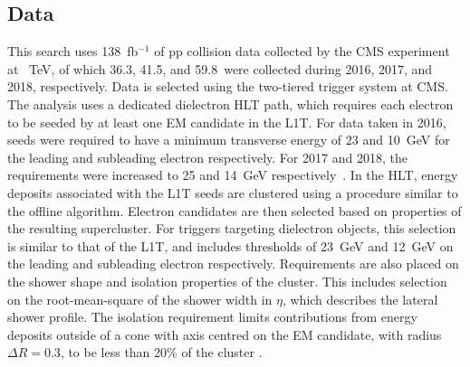 \subsection{Data}

This search uses 138~fb$^{-1}$ of pp collision data collected by the CMS experiment at \sqrts~TeV, of which 36.3, 41.5, and 59.8~\fbinv were collected during 2016, 2017, and 2018, respectively.
Data is selected using the two-tiered trigger system at CMS. 
The analysis uses a dedicated dielectron HLT path, which requires each electron to be seeded by at least one EM candidate in the L1T. For data taken in 2016, seeds were required to have a minimum transverse energy of 23 and 10~GeV for the leading and subleading electron respectively. For 2017 and 2018, the requirements were increased to 25 and 14~GeV respectively~\cite{CMS_egamma_performance}.
In the HLT, energy deposits associated with the L1T seeds are clustered using a procedure similar to the offline algorithm. Electron candidates are then selected based on properties of the resulting supercluster. For triggers targeting dielectron objects, this selection is similar to that of the L1T, and includes thresholds of 23~GeV and 12~GeV on the leading and subleading electron respectively.
Requirements are also placed on the shower shape and isolation properties of the cluster. 
This includes selection on the root-mean-square of the shower width in $\eta$, which describes the lateral shower profile.
The isolation requirement limits contributions from energy deposits outside of a cone with axis centred on the EM candidate, with radius $\Delta R=0.3$, to be less than 20\% of the cluster \Et.


